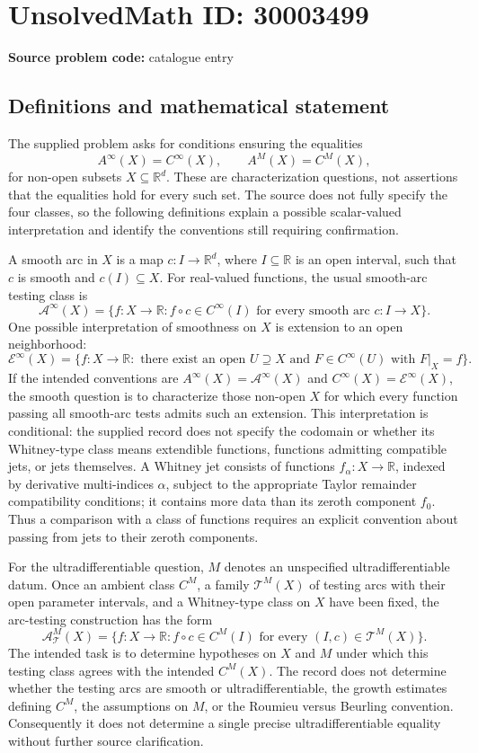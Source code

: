 \documentclass[11pt]{article}
\newcommand{\R}{\mathbb{R}}
\begin{document}
\section*{UnsolvedMath ID: 30003499}
\textbf{Source problem code:} catalogue entry
\subsection{Definitions and mathematical statement}
The supplied problem asks for conditions ensuring the equalities
\[
A^\infty(X)=C^\infty(X),\qquad A^M(X)=C^M(X),
\]
for non-open subsets \(X\subseteq\R^d\). These are characterization questions, not assertions that the equalities hold for every such set. The source does not fully specify the four classes, so the following definitions explain a possible scalar-valued interpretation and identify the conventions still requiring confirmation.

A smooth arc in \(X\) is a map \(c:I\to\R^d\), where \(I\subseteq\R\) is an open interval, such that \(c\) is smooth and \(c(I)\subseteq X\). For real-valued functions, the usual smooth-arc testing class is
\[
\mathcal A^\infty(X)=\{f:X\to\R: f\circ c\in C^\infty(I)\text{ for every smooth arc }c:I\to X\}.
\]
One possible interpretation of smoothness on \(X\) is extension to an open neighborhood:
\[
\mathcal E^\infty(X)=\{f:X\to\R:\text{ there exist an open }U\supseteq X\text{ and }F\in C^\infty(U)\text{ with }F|_X=f\}.
\]
If the intended conventions are \(A^\infty(X)=\mathcal A^\infty(X)\) and \(C^\infty(X)=\mathcal E^\infty(X)\), the smooth question is to characterize those non-open \(X\) for which every function passing all smooth-arc tests admits such an extension. This interpretation is conditional: the supplied record does not specify the codomain or whether its Whitney-type class means extendible functions, functions admitting compatible jets, or jets themselves. A Whitney jet consists of functions \(f_\alpha:X\to\R\), indexed by derivative multi-indices \(\alpha\), subject to the appropriate Taylor remainder compatibility conditions; it contains more data than its zeroth component \(f_0\). Thus a comparison with a class of functions requires an explicit convention about passing from jets to their zeroth components.

For the ultradifferentiable question, \(M\) denotes an unspecified ultradifferentiable datum. Once an ambient class \(C^M\), a family \(\mathscr T^M(X)\) of testing arcs with their open parameter intervals, and a Whitney-type class on \(X\) have been fixed, the arc-testing construction has the form
\[
\mathcal A^M_{\mathscr T}(X)=\{f:X\to\R: f\circ c\in C^M(I)\text{ for every }(I,c)\in\mathscr T^M(X)\}.
\]
The intended task is to determine hypotheses on \(X\) and \(M\) under which this testing class agrees with the intended \(C^M(X)\). The record does not determine whether the testing arcs are smooth or ultradifferentiable, the growth estimates defining \(C^M\), the assumptions on \(M\), or the Roumieu versus Beurling convention. Consequently it does not determine a single precise ultradifferentiable equality without further source clarification.
\end{document}
